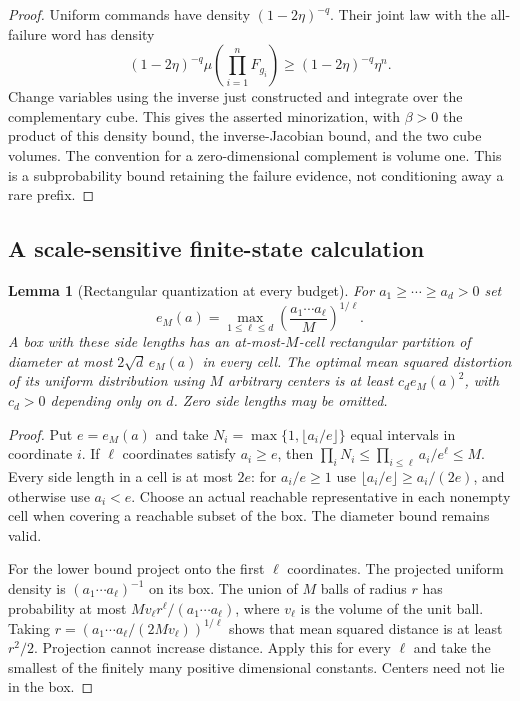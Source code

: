 \documentclass[11pt]{amsart}
\newtheorem{lemma}[theorem]{Lemma}
\theoremstyle{definition}\newtheorem{definition}[theorem]{Definition}
\theoremstyle{remark}\newtheorem{remark}[theorem]{Remark}
\begin{document}
\begin{proof}
Uniform commands have density $(1-2\eta)^{-q}$. Their joint law with the
all-failure word has density
\[
 (1-2\eta)^{-q}\mu\!\left(\prod_{i=1}^nF_{g_i}\right)
       \ge (1-2\eta)^{-q}\eta^n.
\]
Change variables using the inverse just constructed and integrate over
the complementary cube. This gives the asserted minorization, with
$\beta>0$ the product of this density bound, the inverse-Jacobian bound,
and the two cube volumes. The convention for a zero-dimensional
complement is volume one. This is a subprobability bound retaining the
failure evidence, not conditioning away a rare prefix.
\end{proof}

\subsection{A scale-sensitive finite-state calculation}
\begin{lemma}[Rectangular quantization at every budget]\label{lem:rectangle}
For $a_1\ge\cdots\ge a_d>0$ set
\[
 e_M(a)=\max_{1\le\ell\le d}
                  \left(\frac{a_1\cdots a_\ell}{M}\right)^{1/\ell}.
\]
A box with these side lengths has an at-most-$M$-cell rectangular
partition of diameter at most $2\sqrt d\,e_M(a)$ in every cell.
The optimal mean squared distortion of its uniform distribution using
$M$ arbitrary centers is at least $c_d e_M(a)^2$, with $c_d>0$
depending only on $d$. Zero side lengths may be omitted.
\end{lemma}
\begin{proof}
Put $e=e_M(a)$ and take $N_i=\max\{1,\lfloor a_i/e\rfloor\}$
equal intervals in coordinate $i$. If $\ell$ coordinates satisfy
$a_i\ge e$, then
$\prod_iN_i\le\prod_{i\le\ell}a_i/e^\ell\le M$.
Every side length in a cell is at most $2e$: for $a_i/e\ge1$ use
$\lfloor a_i/e\rfloor\ge a_i/(2e)$, and otherwise use $a_i<e$.
Choose an actual reachable representative in each nonempty cell when
covering a reachable subset of the box. The diameter bound remains valid.

For the lower bound project onto the first $\ell$ coordinates. The
projected uniform density is $(a_1\cdots a_\ell)^{-1}$ on its box.
The union of $M$ balls of radius $r$ has probability at most
$M v_\ell r^\ell/(a_1\cdots a_\ell)$, where $v_\ell$ is the volume of
the unit ball. Taking
$r=(a_1\cdots a_\ell/(2Mv_\ell))^{1/\ell}$ shows that mean squared
distance is at least $r^2/2$. Projection cannot increase distance.
Apply this for every $\ell$ and take the smallest of the finitely many
positive dimensional constants. Centers need not lie in the box.
\end{proof}
\end{document}
